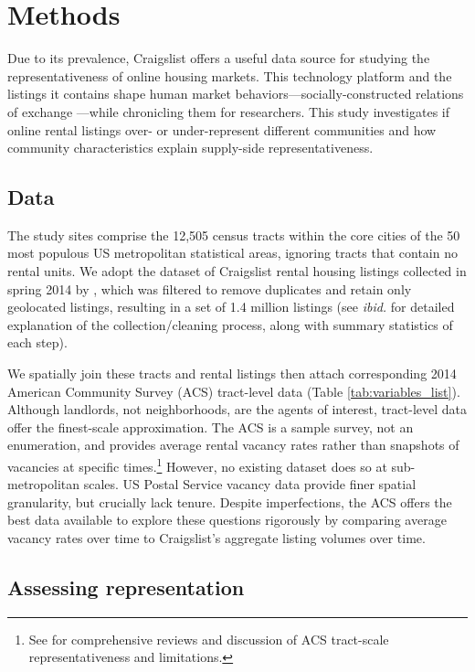 \documentclass[11pt,letterpaper]{article}
\begin{document}
\section{Methods}

Due to its prevalence, Craigslist offers a useful data source for studying the representativeness of online housing markets. This technology platform and the listings it contains shape human market behaviors---socially-constructed relations of exchange \citep{desmond_heavy_2018,cahill_market_2019}---while chronicling them for researchers. This study investigates if online rental listings over- or under-represent different communities and how community characteristics explain supply-side representativeness.

\subsection{Data}

The study sites comprise the 12,505 census tracts within the core cities of the 50 most populous US metropolitan statistical areas, ignoring tracts that contain no rental units. We adopt the dataset of Craigslist rental housing listings collected in spring 2014 by \citet{boeing_new_2017}, which was filtered to remove duplicates and retain only geolocated listings, resulting in a set of 1.4 million listings (see \textit{ibid.} for detailed explanation of the collection/cleaning process, along with summary statistics of each step).

We spatially join these tracts and rental listings then attach corresponding 2014 American Community Survey (ACS) tract-level data (Table \ref{tab:variables_list}). Although landlords, not neighborhoods, are the agents of interest, tract-level data offer the finest-scale approximation. The ACS is a sample survey, not an enumeration, and provides average rental vacancy rates rather than snapshots of vacancies at specific times.\footnote{See \citet{cresce_evaluation_2012,spielman_patterns_2014} for comprehensive reviews and discussion of ACS tract-scale representativeness and limitations.} However, no existing dataset does so at sub-metropolitan scales. US Postal Service vacancy data provide finer spatial granularity, but crucially lack tenure. Despite imperfections, the ACS offers the best data available to explore these questions rigorously by comparing average vacancy rates over time to Craigslist's aggregate listing volumes over time.


\subsection{Assessing representation}
\end{document}
